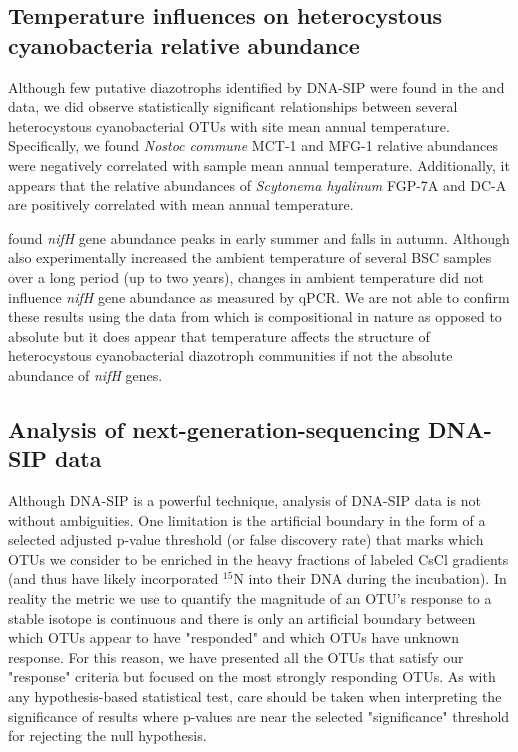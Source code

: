 \subsection{Temperature influences on heterocystous cyanobacteria relative abundance} 
Although few putative diazotrophs identified by DNA-SIP were found
in the \citet{Garcia_Pichel_2013} and \citet{Steven_2013} data, we did observe
statistically significant relationships between several heterocystous
cyanobacterial OTUs with site mean annual temperature. Specifically, we found
\textit{Nostoc commune} MCT-1 and MFG-1 relative abundances were negatively
correlated with sample mean annual temperature. Additionally, it appears that
the relative abundances of \textit{Scytonema hyalinum} FGP-7A and DC-A are
positively correlated with mean annual temperature.

\citet{Yeager_2012} found \textit{nifH} gene abundance peaks in early summer
and falls in autumn. Although \citet{Yeager_2012} also experimentally
increased the ambient temperature of several BSC samples
over a long period (up to two years), changes in ambient temperature did not
influence \textit{nifH} gene abundance as measured by qPCR. We are not able to
confirm these results using the data from \citet{Garcia_Pichel_2013} which is
compositional in nature as opposed to absolute but it does appear that
temperature affects the structure of heterocystous cyanobacterial diazotroph
communities if not the absolute abundance of \textit{nifH} genes. 

\subsection{Analysis of next-generation-sequencing DNA-SIP data}
Although DNA-SIP is a powerful technique, analysis of DNA-SIP data is not
without ambiguities. One limitation is the artificial boundary in the form of a
selected adjusted p-value threshold (or false discovery rate) that marks which
OTUs we consider to be enriched in the heavy fractions of labeled CsCl
gradients (and thus have likely incorporated $^{15}$N into their DNA during the
incubation). In reality the metric we use to quantify the magnitude of an OTU's
response to a stable isotope is continuous and there is only an artificial
boundary between which OTUs appear to have "responded" and which OTUs have
unknown response. For this reason, we have presented all the OTUs that satisfy
our "response" criteria but focused on the most strongly responding OTUs. As
with any hypothesis-based statistical test, care should be taken when
interpreting the significance of results where p-values are near the selected
"significance" threshold for rejecting the null hypothesis.

